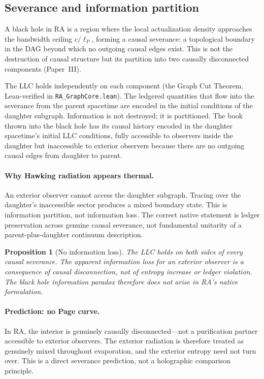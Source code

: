 \documentclass[11pt]{article}
\newtheorem{proposition}{Proposition}
\begin{document}
\subsection{Severance and information partition}

A black hole in RA is a region where the local actualization density approaches the bandwidth ceiling $c/\ell_P$, forming a causal severance: a topological boundary in the DAG beyond which no outgoing causal edges exist. This is not the destruction of causal structure but its partition into two causally disconnected components (Paper~III).

The LLC holds independently on each component (the Graph Cut Theorem, Lean-verified in \texttt{RA\_GraphCore.lean}). The ledgered quantities that flow into the severance from the parent spacetime are encoded in the initial conditions of the daughter subgraph. Information is not destroyed; it is partitioned. The book thrown into the black hole has its causal history encoded in the daughter spacetime's initial LLC conditions, fully accessible to observers inside the daughter but inaccessible to exterior observers because there are no outgoing causal edges from daughter to parent.

\paragraph{Why Hawking radiation appears thermal.} An exterior observer cannot access the daughter subgraph. Tracing over the daughter's inaccessible sector produces a mixed boundary state. This is information partition, not information loss. The correct native statement is ledger preservation across genuine causal severance, not fundamental unitarity of a parent-plus-daughter continuum description.

\begin{proposition}[No information loss]
The LLC holds on both sides of every causal severance. The apparent information loss for an exterior observer is a consequence of causal disconnection, not of entropy increase or ledger violation. The black hole information paradox therefore does not arise in RA's native formulation.
\end{proposition}

\paragraph{Prediction: no Page curve.} In RA, the interior is genuinely causally disconnected---not a purification partner accessible to exterior observers. The exterior radiation is therefore treated as genuinely mixed throughout evaporation, and the exterior entropy need not turn over. This is a direct severance prediction, not a holographic comparison principle.
\end{document}
